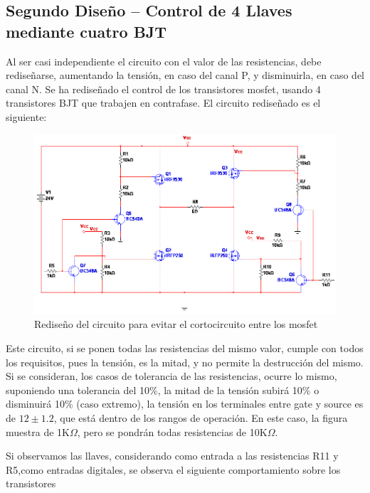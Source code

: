 \subsection{Segundo Diseño – Control de 4 Llaves mediante cuatro BJT}


Al ser casi independiente el circuito con el valor de las resistencias, debe rediseñarse, aumentando la tensión, en caso del canal P, y disminuirla, en caso del canal N. Se ha rediseñado el control de los transistores mosfet, usando 4 transistores BJT que   trabajen en contrafase. El circuito rediseñado es el siguiente: 
\begin{figure}[ht!]
	\centering
	\includegraphics[scale=0.5]{segundo_puente_h} 
	\caption{Rediseño del circuito para evitar el cortocircuito entre los mosfet} 
	\label{fig:segundo_puente_h}
\end{figure} 
Este circuito, si se ponen todas las resistencias del mismo valor, cumple con todos los requisitos, pues la tensión, es la mitad, y no permite la destrucción del mismo. Si se consideran, los casos de tolerancia de las resistencias, ocurre lo mismo, suponiendo una tolerancia del 10\%, la mitad de la tensión subirá 10\% o disminuirá 10\% (caso extremo), la tensión en los terminales entre gate y source es de $12 \pm 1.2$, que está dentro de los rangos de operación. En este caso, la figura muestra de 1K$\Omega$, pero se pondrán todas resistencias de 10K$\Omega$. 

Si observamos las llaves, considerando como entrada a las resistencias R11 y R5,como entradas digitales, se observa el siguiente comportamiento sobre los transistores

